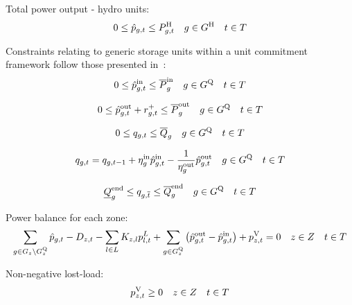 \documentclass{article}
\begin{document}
Total power output - hydro units:
\begin{equation}
0 \leq \vPowerTotal \leq \cPowerOutputHydro \quad  \iGenerator \in \sGeneratorsHydro  \quad  \iInterval \in \sIntervals 
\end{equation}

Constraints relating to generic storage units within a unit commitment framework follow those presented in~\cite{pozo_unit_2014}:
\begin{equation}
0 \leq \vPowerTotalIn \leq \cPowerChargingMax \quad  \iGenerator \in \sStorage  \quad  \iInterval \in \sIntervals
\end{equation}

\begin{equation}
0 \leq \vPowerTotalOut + \vReserveUp \leq \cPowerDischargingMax \quad  \iGenerator \in \sStorage  \quad  \iInterval \in \sIntervals
\end{equation}

\begin{equation}
0 \leq \vStorageUnitEnergy \leq \cStorageUnitEnergyMax \quad  \iGenerator \in \sStorage  \quad  \iInterval \in \sIntervals
\end{equation}

\begin{equation}
\vStorageUnitEnergy = \vStorageUnitEnergy[\iGenerator,\iInterval-1] + \cStorageUnitEfficiencyCharging \vPowerTotalIn - \frac{1}{\cStorageUnitEfficiencyDischarging} \vPowerTotalOut \quad  \iGenerator \in \sStorage  \quad  \iInterval \in \sIntervals
\end{equation}

\begin{equation}
\cStorageUnitEnergyIntervalEndMin \leq \vStorageUnitEnergy[\iGenerator,\iIntervalTerminal] \leq \cStorageUnitEnergyIntervalEndMax \quad  \iGenerator \in \sStorage  \quad  \iInterval \in \sIntervals 
\end{equation}

Power balance for each zone:
\begin{equation}
\sum\limits_{\iGenerator \in \sGenerators_{\iZone} \setminus \sStorage_{\iZone}} \vPowerTotal - \cDemand - \sum\limits_{\iLink \in \sLinks} \cIncidenceMatrix \vPowerFlow + \sum\limits_{\iGenerator \in \sStorage_{\iZone}} \left(\vPowerTotalOut - \vPowerTotalIn\right) + \vLostLoadPower = 0 \quad  \iZone \in \sZones  \quad \iInterval \in \sIntervals
\end{equation}

Non-negative lost-load:
\begin{equation}
\vLostLoadPower \geq 0 \quad  \iZone \in \sZones  \quad \iInterval \in \sIntervals
\end{equation}
\end{document}
